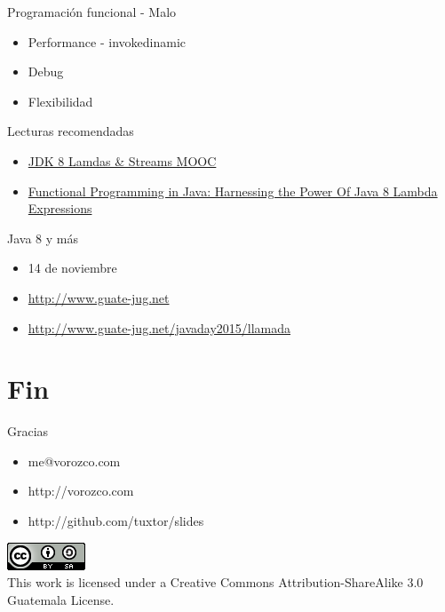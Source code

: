 \documentclass{beamer}
\begin{document}
\begin{frame}{Programación funcional - Malo}
	\begin{itemize}
	\item Performance - invokedinamic
	\item Debug
	\item Flexibilidad
	\end{itemize}
\end{frame}

\begin{frame}{Lecturas recomendadas}
	\begin{itemize}
	\item  \href{https://www.youtube.com/playlist?list=PLMod1hYiIvSZL1xclvHcsV2dMiminf19x}{JDK 8 Lamdas \& Streams MOOC}
	\item  \href{http://www.amazon.com/Functional-Programming-Java-Harnessing-Expressions/dp/1937785467}{Functional Programming in Java: Harnessing the Power Of Java 8 Lambda Expressions}
	\end{itemize}
\end{frame}

\begin{frame}{Java 8 y más}
	\begin{itemize}
	\item 14 de noviembre
	\item \href{http://www.guate-jug.net}{http://www.guate-jug.net}
	\item \href{http://www.guate-jug.net/javaday2015/llamada}{http://www.guate-jug.net/javaday2015/llamada}
	\end{itemize}
\end{frame}

\section{Fin}

\begin{frame}{Gracias}
\begin{itemize}
\item me@vorozco.com
\item http://vorozco.com
\item http://github.com/tuxtor/slides
\end{itemize}
\begin{center}
\includegraphics[width=0.1\linewidth]{Images/cclogo}
\\
This work is licensed under a Creative Commons Attribution-ShareAlike 3.0 Guatemala License.
\end{center}
\end{frame}
\end{document}
